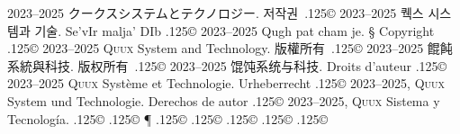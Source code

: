 \documentclass{cookbook}
\begin{document}
{{{	2023--2025 クークスシステムとテクノロジー.
저작권~{\lower.125\baselineskip\hbox{\copyright}}
	2023--2025 퀙스 시스템과 기술.
Se'vIr malja' DIb {\lower.125\baselineskip\hbox{\copyright}} %
	2023--2025 Qugh pat cham je.
\S\texttt{{\gitabbrcommithash}}
Copyright {\lower.125\baselineskip\hbox{\copyright}}
	2023--2025 \textsc{Quux} System and Technology.
版權所有~{\lower.125\baselineskip\hbox{\copyright}}
	2023--2025 餛飩系統與科技.
版权所有~{\lower.125\baselineskip\hbox{\copyright}}
	2023--2025 馄饨系统与科技.
Droits d'auteur {\lower.125\baselineskip\hbox{\copyright}} %
	2023--2025 \textsc{Quux} Système et Technologie.
Urheberrecht {\lower.125\baselineskip\hbox{\copyright}} %
	2023--2025, \textsc{Quux} System und Technologie.
Derechos de autor {\lower.125\baselineskip\hbox{\copyright}} %
	2023--2025, \textsc{Quux} Sistema y Tecnología.
{\lower.125\baselineskip\hbox{\copyright}}
{\lower.125\baselineskip\hbox{\copyright}}
\P\texttt{{\gitabbrcommithash}}
\hspace{.25em plus 1em}%
{\lower.125\baselineskip\hbox{\copyright}}
{\lower.125\baselineskip\hbox{\copyright}}
{\lower.125\baselineskip\hbox{\copyright}}
{\lower.125\baselineskip\hbox{\copyright}}
{\lower.125\baselineskip\hbox{\copyright}}
\vspace{-.5\textheight}%
}}}%
\end{document}
